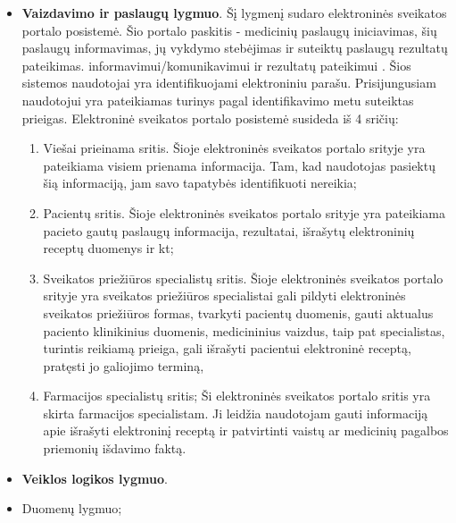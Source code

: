 \begin{itemize}
    \item \textbf{Vaizdavimo ir paslaugų lygmuo}. Šį lygmenį sudaro elektroninės sveikatos portalo posistemė. Šio portalo paskitis - medicinių paslaugų iniciavimas, šių paslaugų informavimas, jų vykdymo stebėjimas ir suteiktų paslaugų rezultatų pateikimas.
    informavimui/komunikavimui ir rezultatų pateikimui \cite{Specifikacija}. Šios sistemos naudotojai yra identifikuojami elektroniniu parašu. Prisijungusiam naudotojui yra pateikiamas turinys pagal identifikavimo metu suteiktas prieigas. Elektroninė sveikatos portalo posistemė susideda iš 4 sričių:
    \begin{enumerate}
        \item Viešai prieinama sritis. Šioje elektroninės sveikatos portalo srityje yra pateikiama visiem prienama informacija. Tam, kad naudotojas pasiektų šią informaciją, jam savo tapatybės identifikuoti nereikia;
        \item Pacientų sritis. Šioje elektroninės sveikatos portalo srityje yra pateikiama pacieto gautų paslaugų informacija, rezultatai, išrašytų elektroninių receptų duomenys ir kt;
        \item Sveikatos priežiūros specialistų sritis. Šioje elektroninės sveikatos portalo srityje yra sveikatos priežiūros specialistai gali pildyti elektroninės sveikatos priežiūros formas, tvarkyti pacientų duomenis, gauti aktualus paciento klinikinius duomenis, medicininius vaizdus, taip pat specialistas, turintis reikiamą prieiga, gali išrašyti pacientui elektroninė receptą, pratęsti jo galiojimo terminą,
        \item Farmacijos specialistų sritis; Ši elektroninės sveikatos portalo sritis yra skirta farmacijos specialistam. Ji leidžia naudotojam gauti informaciją apie išrašyti elektroninį receptą ir patvirtinti vaistų ar medicinių pagalbos priemonių išdavimo faktą.
    \end{enumerate}
    \item \textbf{Veiklos logikos lygmuo}. 
    \item Duomenų lygmuo;
\end{itemize}

